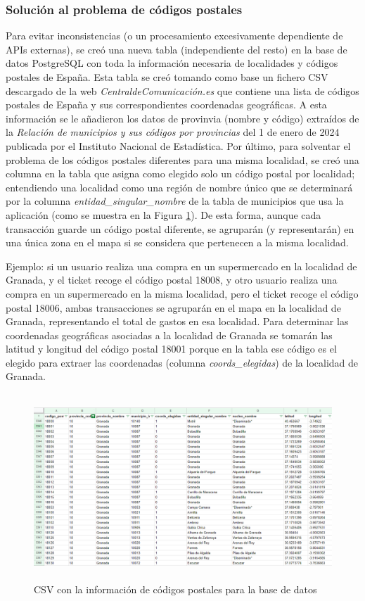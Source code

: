 \subsubsection{Solución al problema de códigos postales}
Para evitar inconsistencias (o un procesamiento excesivamente dependiente de APIs externas), se creó una nueva tabla (independiente del resto) en la base de datos PostgreSQL con toda la información necesaria de localidades y códigos postales de España. Esta tabla se creó tomando como base un fichero CSV descargado de la web \textit{CentraldeComunicación.es} que contiene una lista de códigos postales de España y sus correspondientes coordenadas geográficas. A esta información se le añadieron los datos de provinvia (nombre y código) extraídos de la \textit{Relación de municipios y sus códigos por provincias} del 1 de enero de 2024 publicada por el Instituto Nacional de Estadística. Por último, para solventar el problema de los códigos postales diferentes para una misma localidad, se creó una columna en la tabla que asigna como elegido solo un código postal por localidad; entendiendo una localidad como una región de nombre único que se determinará por la columna \textit{entidad\_singular\_nombre} de la tabla de municipios que usa la aplicación (como se muestra en la Figura \ref{fig:CSV_municipios}). De esta forma, aunque cada transacción guarde un código postal diferente, se agruparán (y representarán) en una única zona en el mapa si se considera que pertenecen a la misma localidad.

Ejemplo: si un usuario realiza una compra en un supermercado en la localidad de Granada, y el ticket recoge el código postal 18008, y otro usuario realiza una compra en un supermercado en la misma localidad, pero el ticket recoge el código postal 18006, ambas transacciones se agruparán en el mapa en la localidad de Granada, representando el total de gastos en esa localidad. Para determinar las coordenadas geográficas asociadas a la localidad de Granada se tomarán las latitud y longitud del código postal 18001 porque en la tabla ese código es el elegido para extraer las coordenadas (columna \textit{coords\_elegidas}) de la localidad de Granada.

\begin{figure}[ht!]
    \centering
    \includegraphics[height=70mm]{imagenes/municipios_cp.png}
    \caption{CSV con la información de códigos postales para la base de datos}
    \label{fig:CSV_municipios}
\end{figure}


